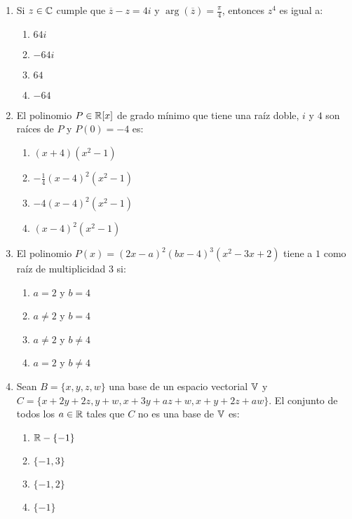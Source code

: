 \documentclass[../practica.root.tex]{subfiles}
\begin{document}
\begin{enumerate}
          \hrulefill{}
    \item Si $z\in\mathbb{C}$ cumple que $\overline{z}-z=4i$ y
          $\arg(\overline{z})=\frac{\pi}{4}$, entonces $z^4$ es igual a:

          \begin{enumerate}
              \item $64i$
              \item $-64i$
              \item $64$
              \item $-64$
          \end{enumerate}

          \hrulefill{}
    \item El polinomio $P\in\mathbb{R}[x]$ de grado mínimo que tiene una raíz doble,
          $i$ y $4$ son raíces de $P$ y $P(0)=-4$ es:

          \begin{enumerate}
              \item $(x+4)(x^2-1)$
              \item $-\frac{1}{4}{(x-4)}^2(x^2-1)$
              \item $-4{(x-4)}^2(x^2-1)$
              \item ${(x-4)}^2(x^2-1)$
          \end{enumerate}

          \hrulefill{}
    \item El polinomio $P(x)={(2x-a)}^2{(bx-4)}^3(x^2-3x+2)$ tiene a $1$ como
          raíz de multiplicidad $3$ si:


          \begin{enumerate}
              \item $a=2$ y $b=4$
              \item $a\neq2$ y $b=4$
              \item $a\neq2$ y $b\neq4$
              \item $a=2$ y $b\neq4$
          \end{enumerate}

          \hrulefill{}
    \item Sean $B=\{x,y,z,w\}$ una base de un espacio vectorial $\mathbb{V}$ y
          $C=\{x+2y+2z,y+w,x+3y+az+w,x+y+2z+aw\}$. El conjunto de todos los
          $a\in\mathbb{R}$ tales que $C$ no es una base de $\mathbb{V}$ es:

          \begin{enumerate}
              \item $\mathbb{R}-\{-1\}$
              \item $\{-1,3\}$
              \item $\{-1,2\}$
              \item $\{-1\}$
          \end{enumerate}


\end{enumerate}
\end{document}
